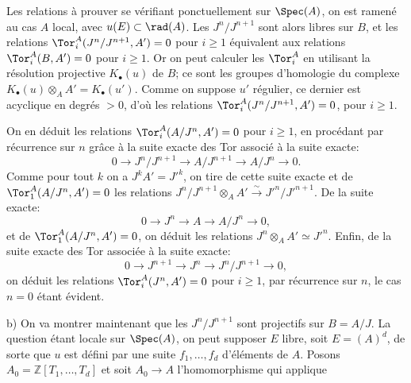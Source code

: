Les relations à prouver se vérifiant ponctuellement sur $\Spec(A)$, on est ramené au cas $A$ local, avec $u(E)\subset\rad(A)$. Les $J^n/J^{n+1}$ sont alors libres sur $B$, et les relations $\Tor_i^A(J^n/J^{n+1},A')=0$ pour $i\geq1$ équivalent aux relations $\Tor_i^A(B,A')=0$ pour $i\geq1$. Or on peut calculer les $\Tor_i^A$ en utilisant la résolution projective $K_\bullet(u)$ de $B$; ce sont les groupes d'homologie du complexe $K_\bullet(u)\otimes_AA'=K_\bullet(u')$. Comme on suppose $u'$ régulier, ce dernier est acyclique en degrés $>0$, d'où les relations $\Tor_i^A(J^n/J^{n+1},A')=0$, pour $i\geq1$.

On en déduit les relations $\Tor_i^A(A/J^n,A')=0$ pour $i\geq1$, en procédant par récurrence sur $n$ grâce à la suite exacte des Tor associé à la suite exacte:
\[
 0\longrightarrow J^n/J^{n+1}\longrightarrow A/J^{n+1}\longrightarrow A/J^n\longrightarrow0.
\]
Comme pour tout $k$ on a $J^kA'=J'^k$, on tire de cette suite exacte et de $\Tor_1^A(A/J^n,A')=0$ les relations $J^n/J^{n+1}\otimes_AA'\xrightarrow{\sim}J'^n/J'^{n+1}$. De la suite exacte:
\[
 0\longrightarrow J^n\longrightarrow A\longrightarrow A/J^n\longrightarrow0,
\]
et de $\Tor_1^A(A/J^n,A')=0$, on déduit les relations $J^n\otimes_AA'\simeq J'^n$. Enfin, de la suite exacte des Tor associée à la suite exacte:
\[
 0\longrightarrow J^{n+1}\longrightarrow J^n\longrightarrow J^n/J^{n+1}\longrightarrow0,
\]
on déduit les relations $\Tor_i^A(J^n,A')=0$ pour $i\geq1$, par récurrence sur $n$, le cas $n=0$ étant évident.

b) On va montrer maintenant que les $J^n/J^{n+1}$ sont projectifs sur $B=A/J$. La question étant locale sur $\Spec(A)$, on peut supposer $E$ libre, soit $E=(A)^d$, de sorte que $u$ est défini par une suite $f_1,\ldots,f_d$ d'éléments de $A$. Posons $A_0=\mathbb Z[T_1,\ldots,T_d]$ et soit $A_0\longrightarrow A$ l'homomorphisme qui applique
